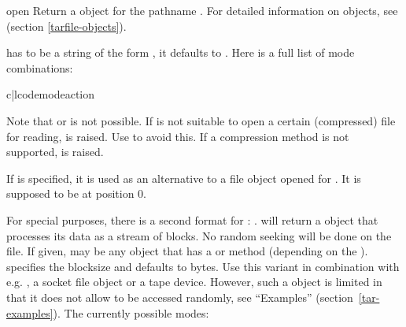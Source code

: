 \begin{funcdesc}{open}{}
    Return a  object for the pathname .
    For detailed information on  objects,
    see  (section \ref{tarfile-objects}).

     has to be a string of the form ,
    it defaults to . Here is a full list of mode combinations:

    \begin{tableii}{c|l}{code}{mode}{action}
    \end{tableii}

    Note that  or  is not possible.
    If  is not suitable to open a certain (compressed) file for
    reading,  is raised. Use   to
    avoid this.  If a compression method is not supported,
     is raised.

    If  is specified, it is used as an alternative to a file
    object opened for . It is supposed to be at position 0.

    For special purposes, there is a second format for :
    .   will return a
     object that processes its data as a stream of
    blocks.  No random seeking will be done on the file. If given,
     may be any object that has a  or
     method (depending on the ).
     specifies the blocksize and defaults to  bytes. Use this variant in combination with
    e.g. , a socket file object or a tape device.
    However, such a  object is limited in that it does
    not allow to be accessed randomly, see ``Examples''
    (section~\ref{tar-examples}).  The currently possible modes:


\end{funcdesc}
